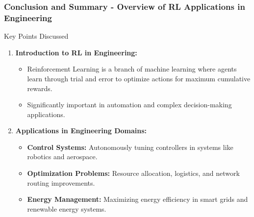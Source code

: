 \documentclass[aspectratio=169]{beamer}
\begin{document}
\begin{frame}[fragile]
    \frametitle{Conclusion and Summary - Overview of RL Applications in Engineering}
    \begin{block}{Key Points Discussed}
        \begin{enumerate}
            \item \textbf{Introduction to RL in Engineering:}
            \begin{itemize}
                \item Reinforcement Learning is a branch of machine learning where agents learn through trial and error to optimize actions for maximum cumulative rewards.
                \item Significantly important in automation and complex decision-making applications.
            \end{itemize}

            \item \textbf{Applications in Engineering Domains:}
            \begin{itemize}
                \item \textbf{Control Systems:} Autonomously tuning controllers in systems like robotics and aerospace.
                \item \textbf{Optimization Problems:} Resource allocation, logistics, and network routing improvements.
                \item \textbf{Energy Management:} Maximizing energy efficiency in smart grids and renewable energy systems.
            \end{itemize}
        \end{enumerate}
    \end{block}
\end{frame}
\end{document}
